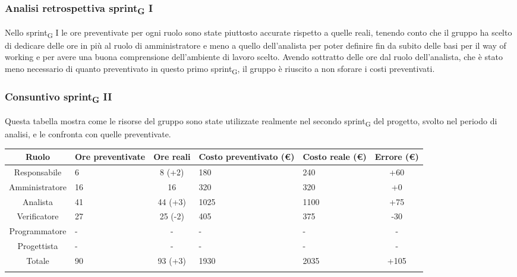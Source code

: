 \subsubsection{Analisi retrospettiva sprint\textsubscript{G} I}
Nello sprint\textsubscript{G} I le ore preventivate per ogni ruolo sono state piuttosto accurate rispetto a quelle reali, tenendo conto che il gruppo ha scelto di dedicare delle ore in più al ruolo di amministratore e meno a quello dell'analista per poter definire fin da subito delle basi per il way of working e per avere una buona comprensione dell'ambiente di lavoro scelto. Avendo sottratto delle ore dal ruolo dell'analista, che è stato meno necessario di quanto preventivato in questo primo sprint\textsubscript{G}, il gruppo è riuscito a non sforare i costi preventivati.



\newpage
\subsubsection{Consuntivo sprint\textsubscript{G} II}
Questa tabella mostra come le risorse del gruppo sono state utilizzate realmente nel secondo sprint\textsubscript{G} del progetto, svolto nel periodo di analisi, e le confronta con quelle preventivate.

\setlength\extrarowheight{5pt}
\begin{tabularx}{\textwidth}{|c|XcXX|c|}
	\hline
	\rowcolor{white}
	\textbf{Ruolo} & \textbf{Ore preventivate} & \textbf{Ore reali} & \textbf{Costo preventivato (€)} & \textbf{Costo reale (€)} & \textbf{Errore (€)} \\
	\hline
	Responsabile &6&8 (+2)&180&240&+60\\
	Amministratore &16&16&320&320&+0\\
	Analista &41&44 (+3)&1025&1100&+75\\
	Verificatore &27&25 (-2)&405&375&-30\\
	Programmatore &-&-&-&-&-\\
	Progettista &-&-&-&-&-\\
	\hline
	Totale &90&93 (+3)&1930&2035&+105\\
	\hline
	\rowcolor{white}
	\caption{Consuntivo ore e costi per ruolo del secondo sprint\textsubscript{G}}
\end{tabularx}
